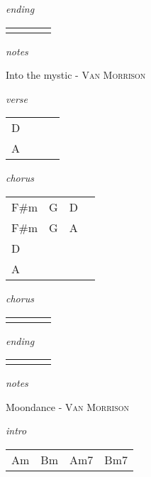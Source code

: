 \documentclass[12pt]{article}
\begin{document}
\textit{ending}

\begin{tabular}{|P{1.25in}|P{1.25in}|P{1.25in}|P{1.25in}|}
    &   &   &   \\
\end{tabular}

\textit{notes}

\newpage

{\Huge Into the mystic} {\huge - \textsc{Van Morrison}}

\huge
\textit{verse}

\begin{tabular}{|P{1.25in}|P{1.25in}|P{1.25in}|P{1.25in}|}
  D &   &   &   \\
  A &   &   &   \\
\end{tabular}

\textit{chorus}

\begin{tabular}{|P{1.25in}|P{1.25in}|P{1.25in}|P{1.25in}|}
  F#m  & G  &  D &   \\
  F#m  & G  &  A &   \\
  D  &  &  &  \\  
  A  &  &  &  \\
\end{tabular}

\textit{chorus}

\begin{tabular}{|P{1.25in}|P{1.25in}|P{1.25in}|P{1.25in}|}
    &   &   &   \\
\end{tabular}

\textit{ending}

\begin{tabular}{|P{1.25in}|P{1.25in}|P{1.25in}|P{1.25in}|}
    &   &   &   \\
\end{tabular}

\textit{notes}

\newpage


{\Huge Moondance} {\huge - \textsc{Van Morrison}}

\huge
\textit{intro}

\begin{tabular}{|P{1.25in}|P{1.25in}|P{1.25in}|P{1.25in}|}
  Am  & Bm  & Am7  & Bm7  \\
\end{tabular}
\end{document}
